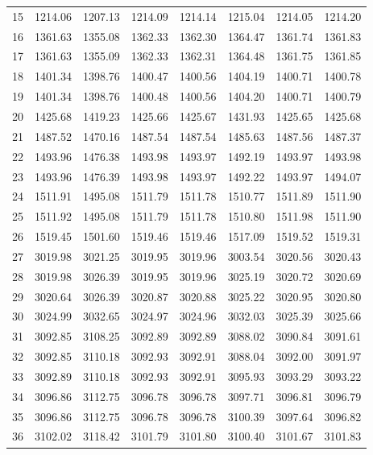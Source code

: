 \documentclass[10pt,oneside]{article}
\begin{document}
\begin{table}[h!]
\begin{tabular}{cccccccc}
15 &   1214.06 & 1207.13 & 1214.09 &    1214.14 &      1215.04 & 1214.05 &   1214.20 \\
16 &   1361.63 & 1355.08 & 1362.33 &    1362.30 &      1364.47 & 1361.74 &   1361.83 \\
17 &   1361.63 & 1355.09 & 1362.33 &    1362.31 &      1364.48 & 1361.75 &   1361.85 \\
18 &   1401.34 & 1398.76 & 1400.47 &    1400.56 &      1404.19 & 1400.71 &   1400.78 \\
19 &   1401.34 & 1398.76 & 1400.48 &    1400.56 &      1404.20 & 1400.71 &   1400.79 \\
20 &   1425.68 & 1419.23 & 1425.66 &    1425.67 &      1431.93 & 1425.65 &   1425.68 \\
21 &   1487.52 & 1470.16 & 1487.54 &    1487.54 &      1485.63 & 1487.56 &   1487.37 \\
22 &   1493.96 & 1476.38 & 1493.98 &    1493.97 &      1492.19 & 1493.97 &   1493.98 \\
23 &   1493.96 & 1476.39 & 1493.98 &    1493.97 &      1492.22 & 1493.97 &   1494.07 \\
24 &   1511.91 & 1495.08 & 1511.79 &    1511.78 &      1510.77 & 1511.89 &   1511.90 \\
25 &   1511.92 & 1495.08 & 1511.79 &    1511.78 &      1510.80 & 1511.98 &   1511.90 \\
26 &   1519.45 & 1501.60 & 1519.46 &    1519.46 &      1517.09 & 1519.52 &   1519.31 \\
27 &   3019.98 & 3021.25 & 3019.95 &    3019.96 &      3003.54 & 3020.56 &   3020.43 \\
28 &   3019.98 & 3026.39 & 3019.95 &    3019.96 &      3025.19 & 3020.72 &   3020.69 \\
29 &   3020.64 & 3026.39 & 3020.87 &    3020.88 &      3025.22 & 3020.95 &   3020.80 \\
30 &   3024.99 & 3032.65 & 3024.97 &    3024.96 &      3032.03 & 3025.39 &   3025.66 \\
31 &   3092.85 & 3108.25 & 3092.89 &    3092.89 &      3088.02 & 3090.84 &   3091.61 \\
32 &   3092.85 & 3110.18 & 3092.93 &    3092.91 &      3088.04 & 3092.00 &   3091.97 \\
33 &   3092.89 & 3110.18 & 3092.93 &    3092.91 &      3095.93 & 3093.29 &   3093.22 \\
34 &   3096.86 & 3112.75 & 3096.78 &    3096.78 &      3097.71 & 3096.81 &   3096.79 \\
35 &   3096.86 & 3112.75 & 3096.78 &    3096.78 &      3100.39 & 3097.64 &   3096.82 \\
36 &   3102.02 & 3118.42 & 3101.79 &    3101.80 &      3100.40 & 3101.67 &   3101.83 \\
\bottomrule
\end{tabular}
\end{table}
\end{document}

